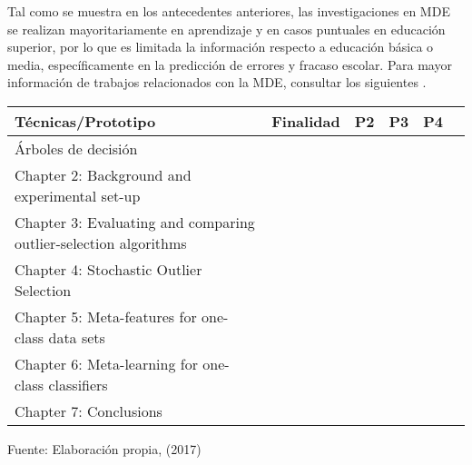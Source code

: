 Tal como se muestra en los antecedentes anteriores, las investigaciones en MDE se realizan mayoritariamente en aprendizaje  y en casos puntuales en educación superior, por lo que es limitada la información respecto a educación básica o media, específicamente en la predicción de errores y fracaso escolar. Para mayor información de trabajos relacionados con la MDE, consultar los siguientes  \parencite{shahiri2015review,sukhija2015recent,anoopkumar2016review,dutt2017systematic}.

\begin{table}[H]
\centering
{}
\begin{tabular}{lccccc}\toprule
Técnicas/Prototipo&Finalidad&P2&P3&P4\\
\midrule
\rowcolor[gray]{0.9}
Árboles de decisión									        & \y & \y & \y & \y \\
Chapter 2: Background and experimental set-up 						&  & \y & \y & \y \\
\rowcolor[gray]{0.9}
Chapter 3: Evaluating and comparing outlier-selection algorithms 	&  & \y &  &  \\
Chapter 4: Stochastic Outlier Selection 							&  &  & \y &  \\
\rowcolor[gray]{0.9}
Chapter 5: Meta-features for one-class data sets 					&  &  &  & \y \\
Chapter 6: Meta-learning for one-class classifiers 					&  &  &  & \y \\
\rowcolor[gray]{0.9}
Chapter 7: Conclusions 											& \y & \y & \y & \y \\
\bottomrule
\end{tabular}
\medskip
\par\centering Fuente: Elaboración propia, (2017)
\end{table}


